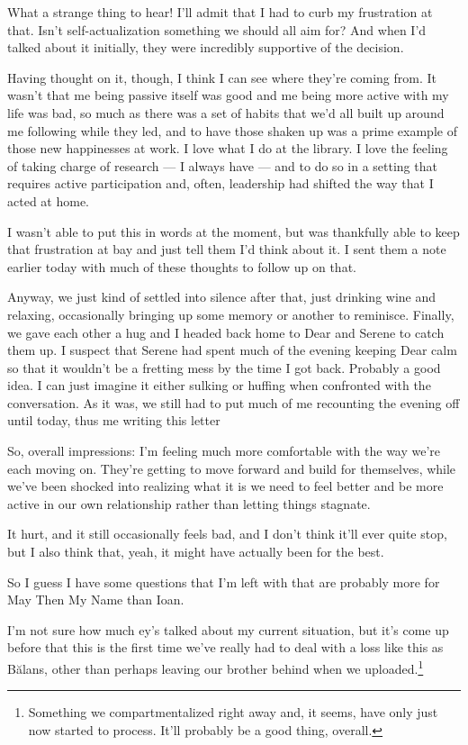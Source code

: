 What a strange thing to hear! I'll admit that I had to curb my frustration at that. Isn't self-actualization something we should all aim for? And when I'd talked about it initially, they were incredibly supportive of the decision.

Having thought on it, though, I think I can see where they're coming from. It wasn't that me being passive itself was good and me being more active with my life was bad, so much as there was a set of habits that we'd all built up around me following while they led, and to have those shaken up was a prime example of those new happinesses at work. I love what I do at the library. I love the feeling of taking charge of research — I always have — and to do so in a setting that requires active participation and, often, leadership had shifted the way that I acted at home.

I wasn't able to put this in words at the moment, but was thankfully able to keep that frustration at bay and just tell them I'd think about it. I sent them a note earlier today with much of these thoughts to follow up on that.

Anyway, we just kind of settled into silence after that, just drinking wine and relaxing, occasionally bringing up some memory or another to reminisce. Finally, we gave each other a hug and I headed back home to Dear and Serene to catch them up. I suspect that Serene had spent much of the evening keeping Dear calm so that it wouldn't be a fretting mess by the time I got back. Probably a good idea. I can just imagine it either sulking or huffing when confronted with the conversation. As it was, we still had to put much of me recounting the evening off until today, thus me writing this letter

So, overall impressions: I'm feeling much more comfortable with the way we're each moving on. They're getting to move forward and build for themselves, while we've been shocked into realizing what it is we need to feel better and be more active in our own relationship rather than letting things stagnate.

It hurt, and it still occasionally feels bad, and I don't think it'll ever quite stop, but I also think that, yeah, it might have actually been for the best.

So I guess I have some questions that I'm left with that are probably more for May Then My Name than Ioan.

I'm not sure how much ey's talked about my current situation, but it's come up before that this is the first time we've really had to deal with a loss like this as Bălans, other than perhaps leaving our brother behind when we uploaded.\footnote{Something we compartmentalized right away and, it seems, have only just now started to process. It'll probably be a good thing, overall.}

